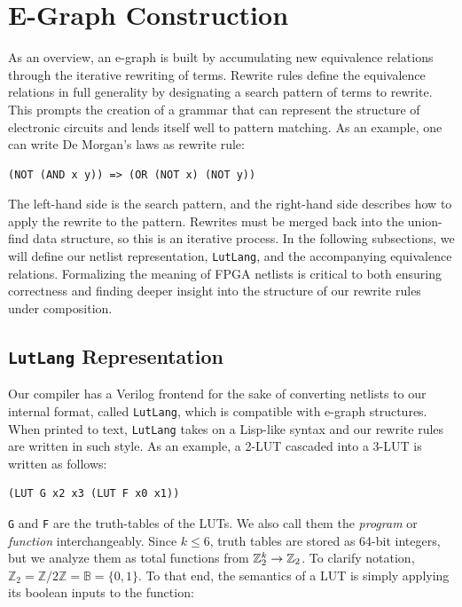 \section{E-Graph Construction}\label{sec:rewrites}
As an overview, an e-graph is built by accumulating new equivalence relations
through the iterative rewriting of terms. Rewrite rules define the equivalence
relations in full generality by designating a search pattern of terms to
rewrite. This prompts the creation of a grammar that can represent the
structure of electronic circuits and lends itself well to pattern matching. As
an example, one can write De Morgan's laws as rewrite rule:

\begin{lstlisting}
(NOT (AND x y)) => (OR (NOT x) (NOT y))
\end{lstlisting}

The left-hand side is the search pattern, and the right-hand side describes how
to apply the rewrite to the pattern. Rewrites must be merged back into the
union-find data structure, so this is an iterative process. In the following
subsections, we will define our netlist representation, \texttt{LutLang}, and
the accompanying equivalence relations. Formalizing the meaning of FPGA
netlists is critical to both ensuring correctness and finding deeper insight
into the structure of our rewrite rules under composition.

\subsection{\texttt{LutLang} Representation}\label{sec:rewrites:lutlang}

Our compiler has a Verilog frontend for the sake of converting netlists to our
internal format, called \texttt{LutLang}, which is compatible with e-graph
structures. When printed to text, \texttt{LutLang} takes on a Lisp-like syntax
and our rewrite rules are written in such style. As an example, a 2-LUT
cascaded into a 3-LUT is written as follows:

\begin{lstlisting}
(LUT G x2 x3 (LUT F x0 x1))
\end{lstlisting}

\texttt{G} and \texttt{F} are the truth-tables of the LUTs.
We also call them the \textit{program} or \textit{function} interchangeably.
Since $k \leq 6$, truth tables are stored as 64-bit integers, but we analyze them as total functions from $\mathbb{Z}_{2}^{k} \rightarrow \mathbb{Z}_{2}$.
To clarify notation, $\mathbb{Z}_2 = \mathbb{Z}/2\mathbb{Z} = \mathbb{B} = \{0,1\}$.
To that end, the semantics of a LUT is simply applying its boolean inputs to the function:

